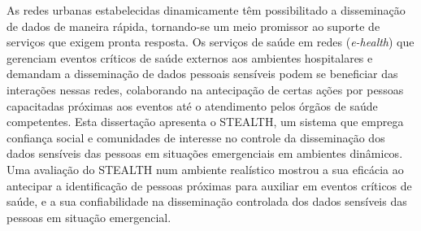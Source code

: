 \documentclass[12pt]{article}
\begin{document}
\begin{resumo} 

As redes urbanas estabelecidas dinamicamente têm possibilitado a disseminação de dados de maneira rápida, tornando-se um meio promissor ao suporte de serviços que exigem pronta resposta. Os serviços de saúde em redes (\textit{e-health}) que gerenciam eventos críticos de saúde externos aos ambientes hospitalares e demandam a disseminação de dados pessoais sensíveis podem se beneficiar das interações nessas redes, colaborando na antecipação de certas ações por pessoas capacitadas próximas aos eventos até o atendimento pelos órgãos de saúde competentes. Esta dissertação apresenta o STEALTH, um sistema que emprega confiança social e comunidades de interesse no controle da disseminação dos dados sensíveis das pessoas em situações emergenciais em ambientes dinâmicos. Uma avaliação do STEALTH num ambiente realístico mostrou a sua eficácia ao antecipar a identificação de pessoas próximas para auxiliar em eventos críticos de saúde, e a sua confiabilidade na disseminação controlada dos dados sensíveis das pessoas em situação emergencial.

\end{resumo}
\end{document}
